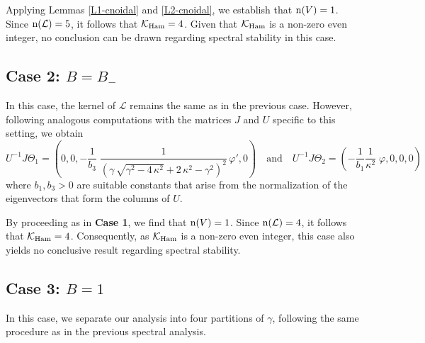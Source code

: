\documentclass[10pt,reqno,a4paper]{amsart} %
\theoremstyle{definition} %
\numberwithin{equation}{section}
\numberwithin{figure}{section}
\begin{document}
Applying Lemmas \ref{L1-cnoidal} and \ref{L2-cnoidal}, we establish that ${\rm n}(V) = 1$. Since ${\rm n}(\mathcal{L}) = 5$, it follows that $\mathcal{K}_{\rm Ham} = 4$. Given that $\mathcal{K}_{\rm Ham}$ is a non-zero even integer, no conclusion can be drawn regarding spectral stability in this case.

\subsection*{Case 2: $B = B_-$} 
In this case, the kernel of $\mathcal{L}$ remains the same as in the previous case. However, following analogous computations with the matrices $J$ and $U$ specific to this setting, we obtain
$$
U^{-1} J \Theta_1=\left( 0,0, -\frac{1}{b_3}\;\frac {1}{ \left( \gamma\,\sqrt {{\gamma}^{2}-4\,{\kappa}^{2}}+2
\,{\kappa}^{2}-{\gamma}^{2} \right) ^{2}}\,\varphi',0  \right) \quad \text{and} \quad U^{-1}J \Theta_2 =\left( - \frac{1}{b_1 }\frac{1}{\kappa^2}\; \varphi,0,0,0  \right)
$$
where $b_1,b_3>0$ are suitable constants that arise from the normalization of the eigenvectors that form the columns of $U$.




By proceeding as in \textbf{Case 1}, we find that ${\rm n}(V) = 1$. Since ${\rm n}(\mathcal{L}) = 4$, it follows that $\mathcal{K}_{\rm Ham} = 4$. Consequently, as $\mathcal{K}_{\rm Ham}$ is a non-zero even integer, this case also yields no conclusive result regarding spectral stability.

\subsection*{Case 3: $B = 1$} 

In this case, we separate our analysis into four partitions of $\gamma$, following the same procedure as in the previous spectral analysis.
\end{document}

